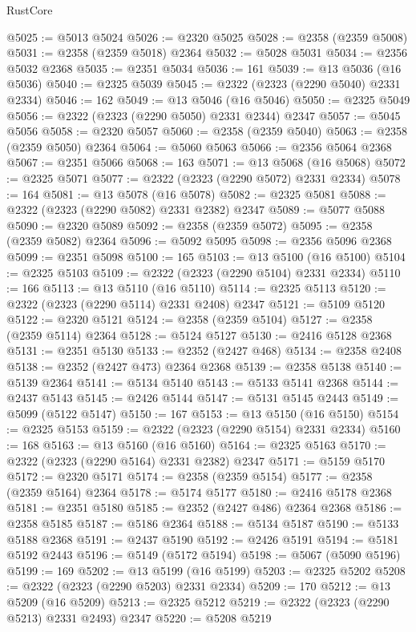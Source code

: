 \begin{lexlean}{RustCore}
\begin{coremodule}
@5025 := @5013 @5024
@5026 := @2320 @5025
@5028 := @2358 (@2359 @5008)
@5031 := @2358 (@2359 @5018) @2364
@5032 := @5028 @5031
@5034 := @2356 @5032 @2368
@5035 := @2351 @5034
@5036 := 161
@5039 := @13 @5036 (@16 @5036)
@5040 := @2325 @5039
@5045 := @2322 (@2323 (@2290 @5040) @2331 @2334)
@5046 := 162
@5049 := @13 @5046 (@16 @5046)
@5050 := @2325 @5049
@5056 := @2322 (@2323 (@2290 @5050) @2331 @2344) @2347
@5057 := @5045 @5056
@5058 := @2320 @5057
@5060 := @2358 (@2359 @5040)
@5063 := @2358 (@2359 @5050) @2364
@5064 := @5060 @5063
@5066 := @2356 @5064 @2368
@5067 := @2351 @5066
@5068 := 163
@5071 := @13 @5068 (@16 @5068)
@5072 := @2325 @5071
@5077 := @2322 (@2323 (@2290 @5072) @2331 @2334)
@5078 := 164
@5081 := @13 @5078 (@16 @5078)
@5082 := @2325 @5081
@5088 := @2322 (@2323 (@2290 @5082) @2331 @2382) @2347
@5089 := @5077 @5088
@5090 := @2320 @5089
@5092 := @2358 (@2359 @5072)
@5095 := @2358 (@2359 @5082) @2364
@5096 := @5092 @5095
@5098 := @2356 @5096 @2368
@5099 := @2351 @5098
@5100 := 165
@5103 := @13 @5100 (@16 @5100)
@5104 := @2325 @5103
@5109 := @2322 (@2323 (@2290 @5104) @2331 @2334)
@5110 := 166
@5113 := @13 @5110 (@16 @5110)
@5114 := @2325 @5113
@5120 := @2322 (@2323 (@2290 @5114) @2331 @2408) @2347
@5121 := @5109 @5120
@5122 := @2320 @5121
@5124 := @2358 (@2359 @5104)
@5127 := @2358 (@2359 @5114) @2364
@5128 := @5124 @5127
@5130 := @2416 @5128 @2368
@5131 := @2351 @5130
@5133 := @2352 (@2427 @468)
@5134 := @2358 @2408
@5138 := @2352 (@2427 @473) @2364 @2368
@5139 := @2358 @5138
@5140 := @5139 @2364
@5141 := @5134 @5140
@5143 := @5133 @5141 @2368
@5144 := @2437 @5143
@5145 := @2426 @5144
@5147 := @5131 @5145 @2443
@5149 := @5099 (@5122 @5147)
@5150 := 167
@5153 := @13 @5150 (@16 @5150)
@5154 := @2325 @5153
@5159 := @2322 (@2323 (@2290 @5154) @2331 @2334)
@5160 := 168
@5163 := @13 @5160 (@16 @5160)
@5164 := @2325 @5163
@5170 := @2322 (@2323 (@2290 @5164) @2331 @2382) @2347
@5171 := @5159 @5170
@5172 := @2320 @5171
@5174 := @2358 (@2359 @5154)
@5177 := @2358 (@2359 @5164) @2364
@5178 := @5174 @5177
@5180 := @2416 @5178 @2368
@5181 := @2351 @5180
@5185 := @2352 (@2427 @486) @2364 @2368
@5186 := @2358 @5185
@5187 := @5186 @2364
@5188 := @5134 @5187
@5190 := @5133 @5188 @2368
@5191 := @2437 @5190
@5192 := @2426 @5191
@5194 := @5181 @5192 @2443
@5196 := @5149 (@5172 @5194)
@5198 := @5067 (@5090 @5196)
@5199 := 169
@5202 := @13 @5199 (@16 @5199)
@5203 := @2325 @5202
@5208 := @2322 (@2323 (@2290 @5203) @2331 @2334)
@5209 := 170
@5212 := @13 @5209 (@16 @5209)
@5213 := @2325 @5212
@5219 := @2322 (@2323 (@2290 @5213) @2331 @2493) @2347
@5220 := @5208 @5219

\end{coremodule}
\end{lexlean}
